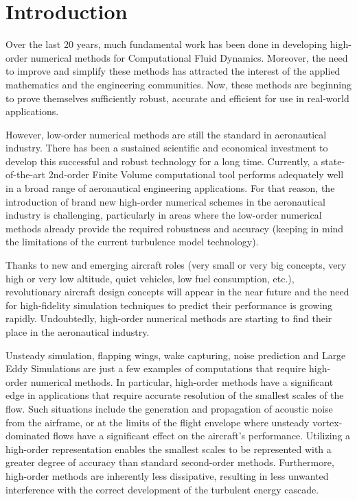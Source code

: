 \section{Introduction}

Over the last 20 years, much fundamental work has been done in developing high-order numerical methods for Computational Fluid Dynamics. Moreover, the need to improve and simplify these methods has attracted the interest of the applied mathematics and the engineering communities. Now, these methods are beginning to prove themselves sufficiently robust, accurate and efficient for use in real-world applications.

However, low-order numerical methods are still the standard in aeronautical industry. There has been a sustained scientific and economical investment to develop this successful and robust technology for a long time. Currently, a state-of-the-art 2nd-order Finite Volume computational tool performs adequately well in a broad range of aeronautical engineering applications. For that reason, the introduction of brand new high-order numerical schemes in the aeronautical industry is challenging, particularly in areas where the low-order numerical methods already provide the required robustness and accuracy (keeping in mind the limitations of the current turbulence model technology).

Thanks to new and emerging aircraft roles (very small or very big concepts, very high or very low altitude, quiet vehicles, low fuel consumption, etc.), revolutionary aircraft design concepts will appear in the near future and the need for high-fidelity simulation techniques to predict their performance is growing rapidly. Undoubtedly, high-order numerical methods are starting to find their place in the aeronautical industry. 

Unsteady simulation, flapping wings, wake capturing, noise prediction and Large Eddy Simulations are just a few examples of computations that require high-order numerical methods. In particular, high-order methods have a significant edge in applications that require accurate resolution of the smallest scales of the flow. Such situations include the generation and propagation of acoustic noise from the airframe, or at the limits of the flight envelope where unsteady vortex-dominated flows have a significant effect on the aircraft's performance. Utilizing a high-order representation enables the smallest scales to be represented with a greater degree of accuracy than standard second-order methods. Furthermore, high-order methods are inherently less dissipative, resulting in less unwanted interference with the correct development of the turbulent energy cascade. 

